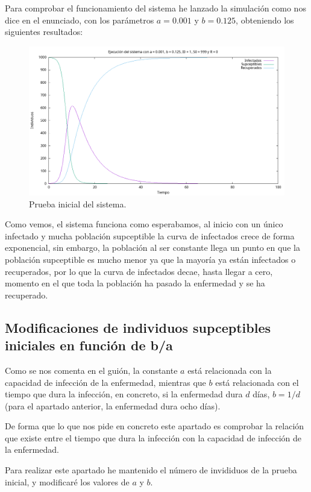 \documentclass[12pt, spanish]{article}
\begin{document}
Para comprobar el funcionamiento del sistema he lanzado la simulación como nos dice en el enunciado, con los parámetros $a = 0.001$ y $b = 0.125$, obteniendo los siguientes resultados:

\begin{figure}[H]
  \centering
      \includegraphics[width=\textwidth]{SIR_prueba_basica.png}
 		\caption{Prueba inicial del sistema.}
\end{figure}

Como vemos, el sistema funciona como esperabamos, al inicio con un único infectado y mucha población supceptible la curva de infectados crece de forma exponencial, sin embargo, la población al ser constante llega un punto en que la población supceptible es mucho menor ya que la mayoría ya están infectados o recuperados, por lo que la curva de infectados decae, hasta llegar a cero, momento en el que toda la población ha pasado la enfermedad y se ha recuperado.

\subsection{Modificaciones de individuos supceptibles iniciales en función de b/a}

Como se nos comenta en el guión, la constante $a$ está relacionada con la capacidad de infección de la enfermedad, mientras que $b$ está relacionada con el tiempo que dura la infección, en concreto, si la enfermedad dura $d$ días, $b = 1/d$ (para el apartado anterior, la enfermedad dura ocho días).

De forma que lo que nos pide en concreto este apartado es comprobar la relación que existe entre el tiempo que dura la infección con la capacidad de infección de la enfermedad.

Para realizar este apartado he mantenido el número de invididuos de la prueba inicial, y modificaré los valores de $a$ y $b$.
\end{document}

